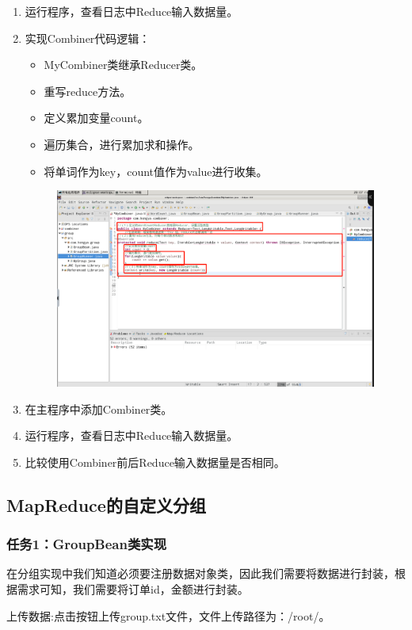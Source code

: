 \documentclass {article}
\begin{document}
\begin{enumerate}
					\item 运行程序，查看日志中Reduce输入数据量。
					\item 实现Combiner代码逻辑：
						\begin{itemize}
							\item MyCombiner类继承Reducer类。
							\item 重写reduce方法。
							\item 定义累加变量count。
							\item 遍历集合，进行累加求和操作。
							\item 将单词作为key，count值作为value进行收集。
						\end{itemize}
					\begin{figure}[H]
						\centering
						\includegraphics[width=4.5in]{figures/fig17.jpg}
					\end{figure}
				
					\item 在主程序中添加Combiner类。
					\item 运行程序，查看日志中Reduce输入数据量。
					\item 比较使用Combiner前后Reduce输入数据量是否相同。
				\end{enumerate}
			
		\subsection{MapReduce的自定义分组}
			\subsubsection{任务1：GroupBean类实现}
				在分组实现中我们知道必须要注册数据对象类，因此我们需要将数据进行封装，根据需求可知，我们需要将订单id，金额进行封装。

				上传数据:点击按钮上传group.txt文件，文件上传路径为：/root/。
					
\end{document}
